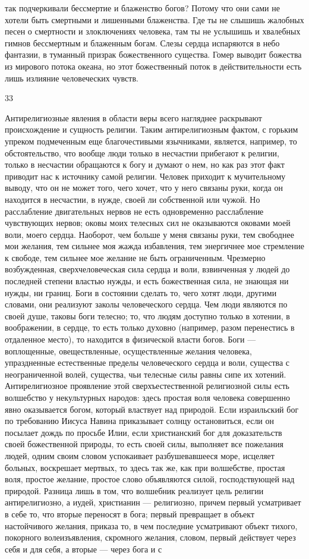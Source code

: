 \documentclass[12pt]{article}
\begin{document}
так подчеркивали бессмертие и блаженство богов? Потому что они сами не хотели быть смертными и лишенными блаженства. Где ты не слышишь жалобных песен о смертности и злоключениях человека, там ты не услышишь и хвалебных гимнов бессмертным и блаженным богам. Слезы сердца испаряются в небо фантазии, в туманный призрак божественного существа. Гомер выводит божества из мирового потока океана, но этот божественный поток в действительности есть лишь излияние человеческих чувств.



33

Антирелигиозные явления в области веры всего нагляднее раскрывают происхождение и сущность религии. Таким антирелигиозным фактом, с горьким упреком подмеченным еще благочестивыми язычниками, является, например, то обстоятельство, что вообще люди только в несчастии прибегают к религии, только в несчастии обращаются к богу и думают о нем, но как раз этот факт приводит нас к источнику самой религии. Человек приходит к мучительному выводу, что он не может того, чего хочет, что у него связаны руки, когда он находится в несчастии, в нужде, своей ли собственной или чужой. Но расслабление двигательных нервов не есть одновременно расслабление чувствующих нервов; оковы моих телесных сил не оказываются оковами моей воли, моего сердца. Наоборот, чем больше у меня связаны руки, тем свободнее мои желания, тем сильнее моя жажда избавления, тем энергичнее мое стремление к свободе, тем сильнее мое желание не быть ограниченным. Чрезмерно возбужденная, сверхчеловеческая сила сердца и воли, взвинченная у людей до последней степени властью нужды, и есть божественная сила, не знающая ни нужды, ни границ. Боги в состоянии сделать то, чего хотят люди, другими словами, они реализуют заколы человеческого сердца. Чем люди являются по своей душе, таковы боги телесно; то, что людям доступно только в хотении, в воображении, в сердце, то есть только духовно (например, разом перенестись в отдаленное место), то находится в физической власти богов. Боги --- воплощенные, овеществленные, осуществленные желания человека, упраздненные естественные пределы человеческого сердца и воли, существа с неограниченной волей, существа, чьи телесные силы равны сипе их хотений. Антирелигиозное проявление этой сверхъестественной религиозной силы есть волшебство у некультурных народов: здесь простая воля человека совершенно явно оказывается богом, который властвует над природой. Если израильский бог по требованию Иисуса Навина приказывает солнцу остановиться, если он посылает дождь по просьбе Илии, если христианский бог для доказательств своей божественной природы, то есть своей силы, выполняет все пожелания людей, одним своим словом успокаивает разбушевавшееся море, исцеляет больных, воскрешает мертвых, то здесь так же, как при волшебстве, простая воля, простое желание, простое слово объявляются силой, господствующей над природой. Разница лишь в том, что волшебник реализует цель религии антирелигиозно, а иудей, христианин --- религиозно, причем первый усматривает в себе то, что вторые переносят в бога; первый превращает в объект настойчивого желания, приказа то, в чем последние усматривают объект тихого, покорного волеизъявления, скромного желания, словом, первый действует через себя и для себя, а вторые --- через бога и с 
\end{document}
